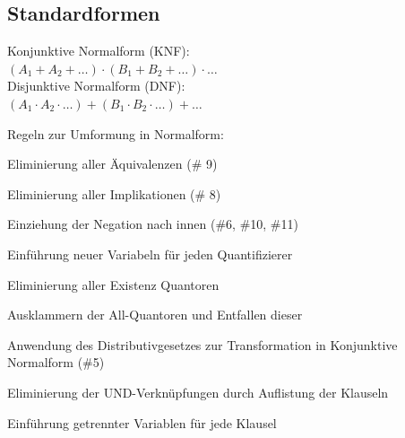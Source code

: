 \documentclass[german,color,6pt]{latex4ei/latex4ei_sheet}
\begin{document}
\begin{sectionbox}
\subsection{Standardformen}
Konjunktive Normalform (KNF): \\
$(A_1 + A_2 + \dots) \cdot (B_1 + B_2 + \dots) \cdot \dots$ \\
Disjunktive Normalform (DNF): \\
$(A_1 \cdot A_2 \cdot \dots) + (B_1 \cdot B_2 \cdot \dots) + \dots$
\begin{cookbox}{Regeln zur Umformung in Normalform:}
	\item Eliminierung aller Äquivalenzen (\# 9)
	\item Eliminierung aller Implikationen (\# 8)
	\item Einziehung der Negation nach innen (\#6, \#10, \#11)
	\item Einführung neuer Variabeln für jeden Quantifizierer
	\item Eliminierung aller Existenz Quantoren
	\item Ausklammern der All-Quantoren und Entfallen dieser
	\item Anwendung des Distributivgesetzes zur Transformation in Konjunktive Normalform (\#5)
	\item Eliminierung der UND-Verknüpfungen durch Auflistung der Klauseln
	\item Einführung getrennter Variablen für jede Klausel
\end{cookbox}
\end{sectionbox}
\end{document}
